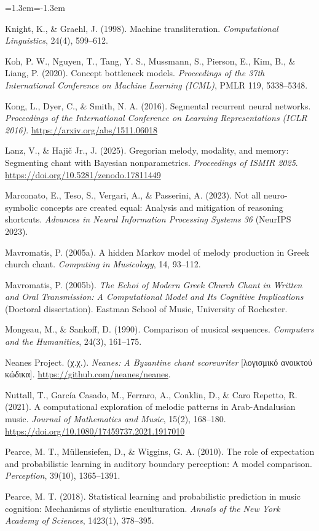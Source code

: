 \documentclass[a4paper]{article}
\newenvironment{reflist}{\begin{list}{}{\leftmargin=1.3em\itemindent=-1.3em\itemsep=0pt\parsep=0pt}\fontsize{9}{9.5}\selectfont}{\end{list}}
\begin{document}
\begin{reflist}
\item Knight, K., \& Graehl, J. (1998). Machine transliteration. \emph{Computational Linguistics}, 24(4), 599--612.
\item Koh, P. W., Nguyen, T., Tang, Y. S., Mussmann, S., Pierson, E., Kim, B., \& Liang, P. (2020). Concept bottleneck models. \emph{Proceedings of the 37th International Conference on Machine Learning (ICML)}, PMLR 119, 5338--5348.
\item Kong, L., Dyer, C., \& Smith, N. A. (2016). Segmental recurrent neural networks. \emph{Proceedings of the International Conference on Learning Representations (ICLR 2016)}. \url{https://arxiv.org/abs/1511.06018}
\item Lanz, V., \& Hajič Jr., J. (2025). Gregorian melody, modality, and memory: Segmenting chant with Bayesian nonparametrics. \emph{Proceedings of ISMIR 2025}. \url{https://doi.org/10.5281/zenodo.17811449}
\item Marconato, E., Teso, S., Vergari, A., \& Passerini, A. (2023). Not all neuro-symbolic concepts are created equal: Analysis and mitigation of reasoning shortcuts. \emph{Advances in Neural Information Processing Systems 36} (NeurIPS 2023).
\item Mavromatis, P. (2005a). A hidden Markov model of melody production in Greek church chant. \emph{Computing in Musicology}, 14, 93--112.
\item Mavromatis, P. (2005b). \emph{The Echoi of Modern Greek Church Chant in Written and Oral Transmission: A Computational Model and Its Cognitive Implications} (Doctoral dissertation). Eastman School of Music, University of Rochester.
\item Mongeau, M., \& Sankoff, D. (1990). Comparison of musical sequences. \emph{Computers and the Humanities}, 24(3), 161--175.
\item Neanes Project. (χ.χ.). \emph{Neanes: A Byzantine chant scorewriter} [λογισμικό ανοικτού κώδικα]. \url{https://github.com/neanes/neanes}.
\item Nuttall, T., García Casado, M., Ferraro, A., Conklin, D., \& Caro Repetto, R. (2021). A computational exploration of melodic patterns in Arab-Andalusian music. \emph{Journal of Mathematics and Music}, 15(2), 168--180. \url{https://doi.org/10.1080/17459737.2021.1917010}
\item Pearce, M. T., Müllensiefen, D., \& Wiggins, G. A. (2010). The role of expectation and probabilistic learning in auditory boundary perception: A model comparison. \emph{Perception}, 39(10), 1365--1391.
\item Pearce, M. T. (2018). Statistical learning and probabilistic prediction in music cognition: Mechanisms of stylistic enculturation. \emph{Annals of the New York Academy of Sciences}, 1423(1), 378--395.

\end{reflist}
\end{document}

